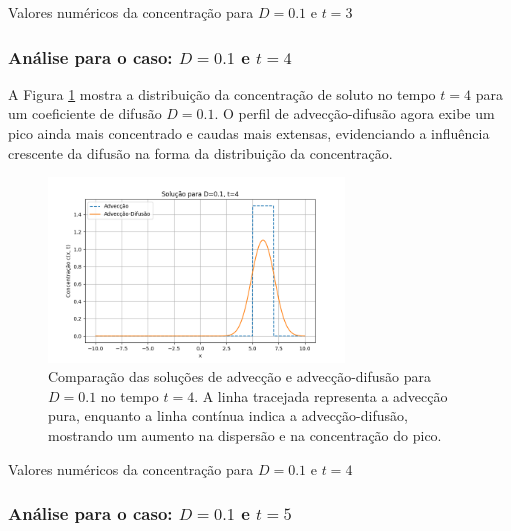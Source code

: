 \begin{table}[H]
    \centering
    \caption{Valores numéricos da concentração para \( D = 0.1 \) e \( t = 3 \)}
    
\end{table}


\subsubsection{Análise para o caso: \( D = 0.1 \) e \( t = 4 \)}

A Figura \ref{fig:advec_diffus_0.1_t4} mostra a distribuição da concentração de soluto no tempo \( t = 4 \) para um coeficiente de difusão \( D = 0.1 \). O perfil de advecção-difusão agora exibe um pico ainda mais concentrado e caudas mais extensas, evidenciando a influência crescente da difusão na forma da distribuição da concentração.

\begin{figure}[H]
    \centering
    \includegraphics[width=0.7\textwidth]{code/plot/Advec_Difus_t4_D0.1.png}
    \caption{Comparação das soluções de advecção e advecção-difusão para \( D = 0.1 \) no tempo \( t = 4 \). A linha tracejada representa a advecção pura, enquanto a linha contínua indica a advecção-difusão, mostrando um aumento na dispersão e na concentração do pico.}
    \label{fig:advec_diffus_0.1_t4}
\end{figure}

\begin{table}[H]
    \centering
    \caption{Valores numéricos da concentração para \( D = 0.1 \) e \( t = 4 \)}
    
\end{table}


\subsubsection{Análise para o caso: \( D = 0.1 \) e \( t = 5 \)}

